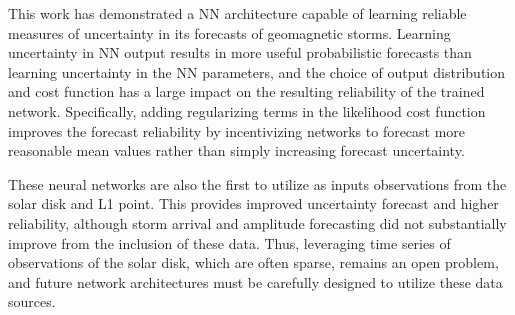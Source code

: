 This work has demonstrated a NN architecture capable of learning reliable measures of uncertainty in its forecasts of geomagnetic storms. Learning uncertainty in NN output results in more useful probabilistic forecasts than learning uncertainty in the NN parameters, and the choice of output distribution and cost function has a large impact on the resulting reliability of the trained network. Specifically, adding regularizing terms in the likelihood cost function improves the forecast reliability by incentivizing networks to forecast more reasonable mean values rather than simply increasing forecast uncertainty.

These neural networks are also the first to utilize as inputs observations from the solar disk and L1 point. This provides improved uncertainty forecast and higher reliability, although storm arrival and amplitude forecasting did not substantially improve from the inclusion of these data. Thus, leveraging time series of observations of the solar disk, which are often sparse, remains an open problem, and future network architectures must be carefully designed to utilize these data sources. 